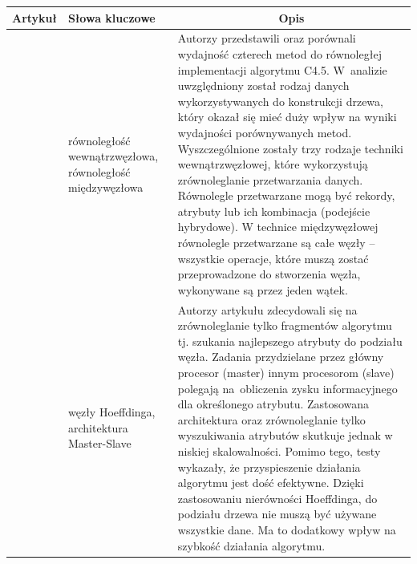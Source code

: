 \documentclass[12pt]{article}
\begin{document}
    \begin{center}

        \begin{longtable}{| c | p{} | p{} |}

            \hline
            
            \textbf{Artykuł} &\textbf{Słowa kluczowe} & \multicolumn{1}{|c|}{\textbf{Opis}}
            
            \\ \hline \hline 

            \cite{parallelization-of-decision-tree-al} &

            równoległość wewnątrzwęzłowa, równoległość międzywęzłowa &

            Autorzy przedstawili oraz porównali wydajność czterech metod do równoległej implementacji algorytmu C4.5.
            W~analizie uwzględniony został rodzaj danych wykorzystywanych do konstrukcji drzewa, który okazał
            się mieć duży wpływ na wyniki wydajności porównywanych metod. Wyszczególnione zostały trzy rodzaje
            techniki wewnątrzwęzłowej, które wykorzystują zrównoleglanie przetwarzania danych. Równolegle
            przetwarzane mogą być rekordy, atrybuty lub ich kombinacja (podejście hybrydowe). W technice międzywęzłowej
            równolegle przetwarzane są całe węzły -- wszystkie operacje, które muszą zostać przeprowadzone do stworzenia
            węzła, wykonywane są przez jeden wątek. \\
            
            \hline

            \cite{parallel-hoeffding-decision-tree} &

            węzły Hoeffdinga, architektura Master-Slave &

            Autorzy artykułu zdecydowali się na zrównoleglanie tylko fragmentów algorytmu tj. szukania
            najlepszego atrybuty do podziału węzła. Zadania przydzielane przez główny procesor
            (master) innym procesorom (slave) polegają na~obliczenia zysku informacyjnego dla określonego
            atrybutu. Zastosowana architektura oraz zrównoleglanie tylko wyszukiwania atrybutów skutkuje
            jednak w niskiej skalowalności. Pomimo tego, testy wykazały, że przyspieszenie działania algorytmu
            jest dość efektywne. Dzięki zastosowaniu nierówności Hoeffdinga, do podziału drzewa nie muszą być
            używane wszystkie dane. Ma to dodatkowy wpływ na szybkość działania algorytmu. \\
            

\end{longtable}
\end{center}
\end{document}
